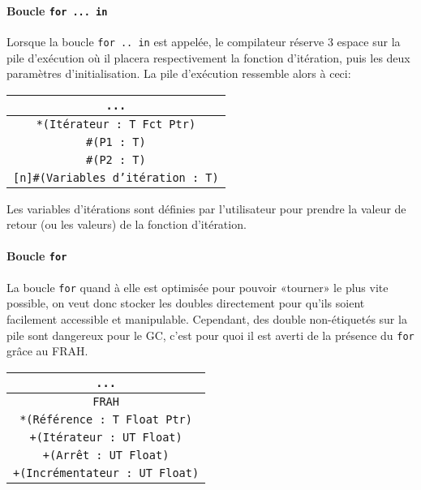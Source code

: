 \documentclass{article}
\begin{document}
\paragraph{Boucle \texttt{\textbf{for ... in}}}
Lorsque la boucle {\lstset{style=lua}\lstinline$for .. in$} est appelée, le compilateur réserve 3 espace sur la pile d'exécution où il placera respectivement la fonction d'itération, puis les deux paramètres d'initialisation. La pile d'exécution ressemble alors à ceci:
\begin{center}
  \begin{tabular}{|c|}
    \hline
    \texttt{...}\\
    \hline
    \texttt{*(Itérateur : T Fct Ptr)}\\
    \hline
    \texttt{\#{}(P1 : T)}\\
    \hline
    \texttt{\#{}(P2 : T)}\\
    \hline
    \texttt{[n]\#{}(Variables d'itération : T)}\\
    \hline
  \end{tabular}
\end{center}
Les variables d'itérations sont définies par l'utilisateur pour prendre la valeur de retour (ou les valeurs) de la fonction d'itération.

\paragraph{Boucle \texttt{\textbf{for}}}
La boucle {\lstset{style=lua}\lstinline$for$} quand à elle est optimisée pour pouvoir «tourner» le plus vite possible, on veut donc stocker les doubles directement pour qu'ils soient facilement accessible et manipulable. Cependant, des double non-étiquetés sur la pile sont dangereux pour le GC, c'est pour quoi il est averti de la présence du {\lstset{style=lua}\lstinline$for$} grâce au FRAH.
\begin{center}
  \begin{tabular}{|c|}
    \hline
    \texttt{...}\\
    \hline
    \texttt{FRAH}\\
    \hline
    \texttt{*(Référence : T Float Ptr)}\\
    \hline
    \texttt{+(Itérateur : UT Float)}\\
    \hline
    \texttt{+(Arrêt : UT Float)}\\
    \hline
    \texttt{+(Incrémentateur : UT Float)}\\
    \hline
  \end{tabular}
\end{center}
\end{document}
